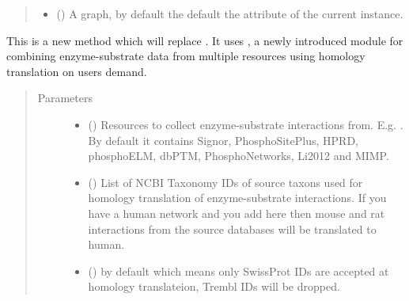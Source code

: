 \documentclass[letterpaper,10pt,english]{sphinxmanual}
\begin{document}
\begin{fulllineitems}
\begin{fulllineitems}
\begin{quote}
\begin{description}
\begin{itemize}
\item {} 
 () \textendash{} A graph, by default the default the  attribute of the
current instance.

\end{itemize}

\end{description}\end{quote}

\end{fulllineitems}


\begin{fulllineitems}
\label{\detokenize{main:pypath.main.PyPath.load_ptms2}}
This is a new method which will replace .
It uses , a newly introduced
module for combining enzyme-substrate data from multiple
resources using homology translation on users demand.
\begin{quote}\begin{description}
\item[{Parameters}] \leavevmode\begin{itemize}
\item {} 
 () \textendash{} Resources to collect enzyme-substrate
interactions from. E.g. . By default
it contains Signor, PhosphoSitePlus, HPRD, phosphoELM, dbPTM,
PhosphoNetworks, Li2012 and MIMP.

\item {} 
 () \textendash{} List of NCBI Taxonomy IDs of
source taxons used for homology translation of enzyme-substrate
interactions. If you have a human network and you add here
\sphinxtitleref{{[}10090, 10116{]}} then mouse and rat interactions from the source
databases will be translated to human.

\item {} 
 () \textendash{}  by default which means
only SwissProt IDs are accepted at homology translateion, Trembl
IDs will be dropped.


\end{itemize}
\end{description}
\end{quote}
\end{fulllineitems}
\end{fulllineitems}
\end{document}
